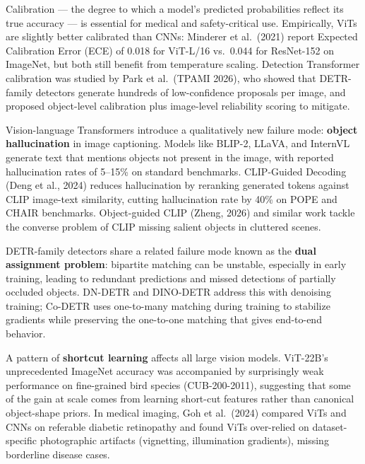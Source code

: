 Calibration --- the degree to which a model's predicted probabilities reflect its true accuracy --- is essential for medical and safety-critical use. Empirically, ViTs are slightly better calibrated than CNNs: Minderer et al.~(2021) report Expected Calibration Error (ECE) of 0.018 for ViT-L/16 vs.~0.044 for ResNet-152 on ImageNet, but both still benefit from temperature scaling. Detection Transformer calibration was studied by Park et al.~(TPAMI 2026), who showed that DETR-family detectors generate hundreds of low-confidence proposals per image, and proposed object-level calibration plus image-level reliability scoring to mitigate.

Vision-language Transformers introduce a qualitatively new failure mode: \textbf{object hallucination} in image captioning. Models like BLIP-2, LLaVA, and InternVL generate text that mentions objects not present in the image, with reported hallucination rates of 5--15\% on standard benchmarks. CLIP-Guided Decoding (Deng et al., 2024) reduces hallucination by reranking generated tokens against CLIP image-text similarity, cutting hallucination rate by 40\% on POPE and CHAIR benchmarks. Object-guided CLIP (Zheng, 2026) and similar work tackle the converse problem of CLIP missing salient objects in cluttered scenes.

DETR-family detectors share a related failure mode known as the \textbf{dual assignment problem}: bipartite matching can be unstable, especially in early training, leading to redundant predictions and missed detections of partially occluded objects. DN-DETR and DINO-DETR address this with denoising training; Co-DETR uses one-to-many matching during training to stabilize gradients while preserving the one-to-one matching that gives end-to-end behavior.

A pattern of \textbf{shortcut learning} affects all large vision models. ViT-22B's unprecedented ImageNet accuracy was accompanied by surprisingly weak performance on fine-grained bird species (CUB-200-2011), suggesting that some of the gain at scale comes from learning short-cut features rather than canonical object-shape priors. In medical imaging, Goh et al.~(2024) compared ViTs and CNNs on referable diabetic retinopathy and found ViTs over-relied on dataset-specific photographic artifacts (vignetting, illumination gradients), missing borderline disease cases.

